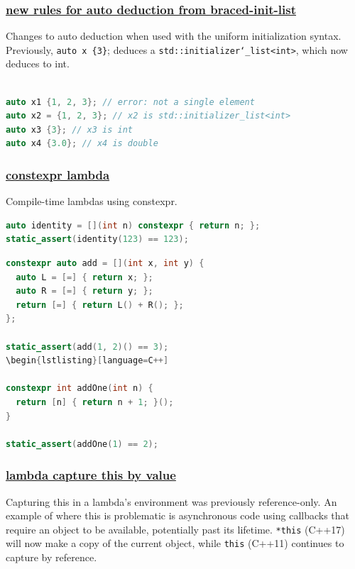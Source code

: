 \subsubsection{\href{https://github.com/AnthonyCalandra/modern-cpp-features/tree/master\#new-rules-for-auto-deduction-from-braced-init-list}
                    {new rules for auto deduction from braced-init-list}}
Changes to auto deduction when used with the uniform initialization syntax. 
Previously, \texttt{auto x \{3\}}; deduces a \texttt{std::initializer\char`_list<int>}, 
which now deduces to int.
\begin{lstlisting}[language=C++]

auto x1 {1, 2, 3}; // error: not a single element
auto x2 = {1, 2, 3}; // x2 is std::initializer_list<int>
auto x3 {3}; // x3 is int
auto x4 {3.0}; // x4 is double
\end{lstlisting}

\subsubsection{\href{https://github.com/AnthonyCalandra/modern-cpp-features/tree/master\#constexpr-lambda}
                    {constexpr lambda}}
Compile-time lambdas using constexpr.

\begin{lstlisting}[language=C++]
auto identity = [](int n) constexpr { return n; };
static_assert(identity(123) == 123);
\end{lstlisting}

\begin{lstlisting}[language=C++]
constexpr auto add = [](int x, int y) {
  auto L = [=] { return x; };
  auto R = [=] { return y; };
  return [=] { return L() + R(); };
};

static_assert(add(1, 2)() == 3);
\begin{lstlisting}[language=C++]

constexpr int addOne(int n) {
  return [n] { return n + 1; }();
}

static_assert(addOne(1) == 2);
\end{lstlisting}

\subsubsection{\href{https://github.com/AnthonyCalandra/modern-cpp-features/tree/master\#lambda-capture-this-by-value}
                    {lambda capture this by value}}
Capturing this in a lambda's environment was previously reference-only. 
An example of where this is problematic is asynchronous code using callbacks 
that require an object to be available, potentially past its lifetime. 
\texttt{*this} (C++17) will now make a copy of the current object, while 
\texttt{this} (C++11) continues to capture by reference.


